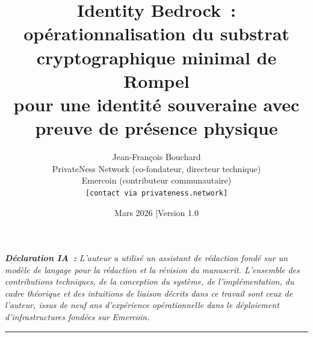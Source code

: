\documentclass[11pt,a4paper]{article}
\theoremstyle{definition}
\begin{document}
\title{\textbf{Identity Bedrock~: opérationnalisation du substrat
cryptographique minimal de Rompel\\pour une identité souveraine avec
preuve de présence physique}}

\author{
  Jean-Fran\c{c}ois Bouchard\\[4pt]
  \small PrivateNess Network (co-fondateur, directeur technique)\\
  \small Emercoin (contributeur communautaire)\\[4pt]
  \small \texttt{[contact via privateness.network]}
}

\date{Mars 2026 \quad|\quad Version 1.0}

\maketitle

\begin{center}
\small\itshape
\textbf{Déclaration IA~:} L'auteur a utilisé un assistant de rédaction
fondé sur un modèle de langage pour la rédaction et la révision du
manuscrit. L'ensemble des contributions techniques, de la conception
du système, de l'implémentation, du cadre théorique et des intuitions
de liaison décrits dans ce travail sont ceux de l'auteur, issus de
neuf ans d'expérience opérationnelle dans le déploiement
d'infrastructures fondées sur Emercoin.
\end{center}

\vspace{4pt}\noindent\rule{\textwidth}{0.4pt}\vspace{2pt}
\end{document}

